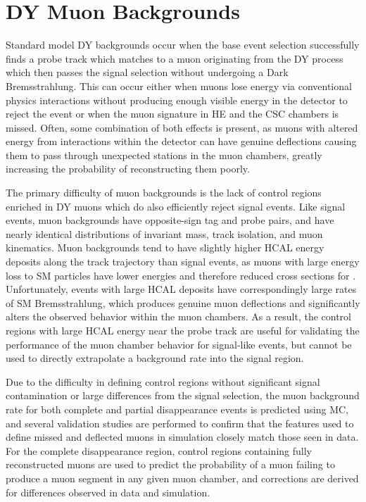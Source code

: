\section{DY Muon Backgrounds}
Standard model DY backgrounds occur when the base event selection successfully finds a probe track which matches to a muon originating from the DY process which then passes the signal selection without undergoing a Dark Bremsstrahlung. 
This can occur either when muons lose energy via conventional physics interactions without producing enough visible energy in the detector to reject the event or when the muon signature in HE and the CSC chambers is missed.
Often, some combination of both effects is present, as muons with altered energy from interactions within the detector can have genuine deflections causing them to pass through unexpected stations in the muon chambers, greatly increasing the probability of reconstructing them poorly.

The primary difficulty of muon backgrounds is the lack of control regions enriched in DY muons which do also efficiently reject signal events.
Like signal events, muon backgrounds have opposite-sign tag and probe pairs, and have nearly identical distributions of invariant mass, track isolation, and muon kinematics.
Muon backgrounds tend to have slightly higher HCAL energy deposits along the track trajectory than signal events, as muons with large energy loss to SM particles have lower energies and therefore reduced cross sections for \dbrem.
Unfortunately, events with large HCAL deposits have correspondingly large rates of SM Bremsstrahlung, which produces genuine muon deflections and significantly alters the observed behavior within the muon chambers.
As a result, the control regions with large HCAL energy near the probe track are useful for validating the performance of the muon chamber behavior for signal-like events, but cannot be used to directly extrapolate a background rate into the signal region. 

Due to the difficulty in defining control regions without significant signal contamination or large differences from the signal selection, the muon background rate for both complete and partial disappearance events is predicted using MC, and several validation studies are performed to confirm that the features used to define missed and deflected muons in simulation closely match those seen in data.
For the complete disappearance region, control regions containing fully reconstructed muons are used to predict the probability of a muon failing to produce a muon segment in any given muon chamber, and corrections are derived for differences observed in data and simulation.

